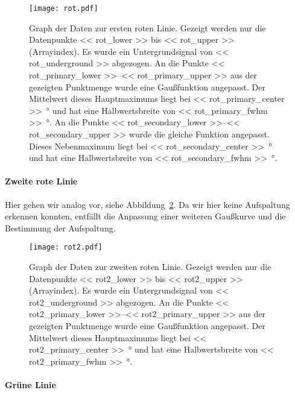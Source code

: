 \begin{figure}[htbp]
    \centering
    \texttt{[image: rot.pdf]}
    \caption{%
        Graph der Daten zur ersten roten Linie. Gezeigt werden nur die
        Datenpunkte \num{<< rot_lower >>} bis \num{<< rot_upper >>}
        (Arrayindex). Es wurde ein Untergrundsignal von \num{<< rot_underground
        >>} abgezogen. An die Punkte \numrange{<< rot_primary_lower >>}{<<
        rot_primary_upper >>} aus der gezeigten Punktmenge wurde eine
        Gaußfunktion angepasst. Der Mittelwert dieses Hauptmaximums liegt bei
        \SI{<< rot_primary_center >>}{\degree} und hat eine Halbwertsbreite von
        \SI{<< rot_primary_fwhm >>}{\degree}. An die Punkte \numrange{<<
        rot_secondary_lower >>}{<< rot_secondary_upper >>} wurde die gleiche
        Funktion angepasst. Dieses Nebenmaximum liegt bei \SI{<<
        rot_secondary_center >>}{\degree} und hat eine Halbwertsbreite von
        \SI{<< rot_secondary_fwhm >>}{\degree}.
    }
    \label{fig:rot}
\end{figure}

\paragraph{Zweite rote Linie}

Hier gehen wir analog vor, siehe Abbildung~\ref{fig:rot2}. Da wir hier keine
Aufspaltung erkennen konnten, entfällt die Anpassung einer weiteren Gaußkurve
und die Bestimmung der Aufspaltung.

\begin{figure}[htbp]
    \centering
    \texttt{[image: rot2.pdf]}
    \caption{%
        Graph der Daten zur zweiten roten Linie. Gezeigt werden nur die
        Datenpunkte \num{<< rot2_lower >>} bis \num{<< rot2_upper >>}
        (Arrayindex). Es wurde ein Untergrundsignal von \num{<< rot2_underground
        >>} abgezogen. An die Punkte \numrange{<< rot2_primary_lower >>}{<<
        rot2_primary_upper >>} aus der gezeigten Punktmenge wurde eine
        Gaußfunktion angepasst. Der Mittelwert dieses Hauptmaximums liegt bei
        \SI{<< rot2_primary_center >>}{\degree} und hat eine Halbwertsbreite von
        \SI{<< rot2_primary_fwhm >>}{\degree}.
    }
    \label{fig:rot2}
\end{figure}

\paragraph{Grüne Linie}

